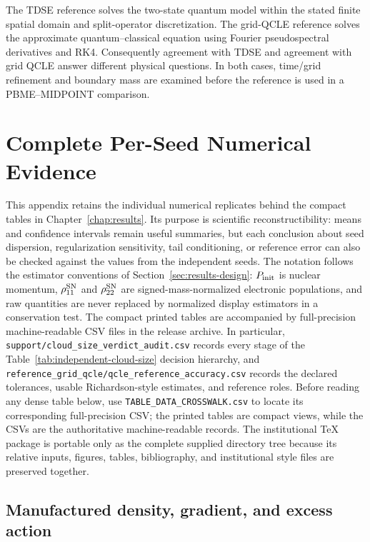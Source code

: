 \documentclass[
  11pt,
  letterpaper,
  onehalfspacing,
  normalmargins,
  equalmargins,
  oneside
]{ut-thesis}
\begin{document}
The TDSE reference solves the two-state quantum model within the stated
finite spatial domain and split-operator discretization. The grid-QCLE
reference solves the approximate quantum--classical equation using Fourier
pseudospectral derivatives and RK4. Consequently agreement with TDSE and
agreement with grid QCLE answer different physical questions. In both cases,
time/grid refinement and boundary mass are examined before the reference is
used in a PBME--MIDPOINT comparison.

\chapter[Complete Per-Seed Evidence]{Complete Per-Seed Numerical Evidence}
\label{app:complete-seed-evidence}

This appendix retains the individual numerical replicates behind the compact
tables in Chapter~\ref{chap:results}. Its purpose is scientific
reconstructibility: means and confidence intervals remain useful summaries,
but each conclusion about seed dispersion, regularization sensitivity, tail
conditioning, or reference error can also be checked against the values from
the independent seeds. The notation follows the estimator conventions of
Section~\ref{sec:results-design}: \(P_{\rm init}\) is nuclear
momentum, \(\rho_{11}^{\rm SN}\) and \(\rho_{22}^{\rm SN}\) are
signed-mass-normalized electronic populations, and raw quantities are never
replaced by normalized display estimators in a conservation test.
The compact printed tables are accompanied by full-precision machine-readable
CSV files in the release archive. In particular,
\texttt{support/cloud\_size\_verdict\_audit.csv} records every stage of the
Table~\ref{tab:independent-cloud-size} decision hierarchy, and
\texttt{reference\_grid\_qcle/qcle\_reference\_accuracy.csv} records the
declared tolerances, usable Richardson-style estimates, and reference roles.
Before reading any dense table below, use
\texttt{TABLE\_DATA\_CROSSWALK.csv} to locate its corresponding full-precision
CSV; the printed tables are compact views, while the CSVs are the authoritative
machine-readable records. The institutional \TeX{} package is portable only
as the complete supplied directory tree because its relative inputs, figures,
tables, bibliography, and institutional style files are preserved together.

\section{Manufactured density, gradient, and excess action}
\end{document}
